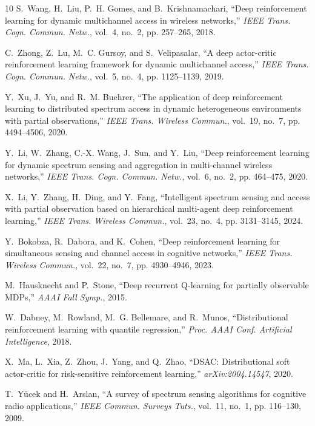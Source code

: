 \documentclass[journal]{IEEEtran}
\begin{document}
{\begin{thebibliography}{10}
S.~Wang, H.~Liu, P.~H. Gomes, and B.~Krishnamachari, ``Deep reinforcement
  learning for dynamic multichannel access in wireless networks,'' \emph{IEEE
  Trans. Cogn. Commun. Netw.}, vol.~4, no.~2, pp. 257--265, 2018.

C.~Zhong, Z.~Lu, M.~C. Gursoy, and S.~Velipasalar, ``A deep actor-critic
  reinforcement learning framework for dynamic multichannel access,''
  \emph{IEEE Trans. Cogn. Commun. Netw.}, vol.~5, no.~4, pp. 1125--1139, 2019.

Y.~Xu, J.~Yu, and R.~M. Buehrer, ``The application of deep reinforcement
  learning to distributed spectrum access in dynamic heterogeneous environments
  with partial observations,'' \emph{IEEE Trans. Wireless Commun.}, vol.~19,
  no.~7, pp. 4494--4506, 2020.

Y.~Li, W.~Zhang, C.-X. Wang, J.~Sun, and Y.~Liu, ``Deep reinforcement learning
  for dynamic spectrum sensing and aggregation in multi-channel wireless
  networks,'' \emph{IEEE Trans. Cogn. Commun. Netw.}, vol.~6, no.~2, pp.
  464--475, 2020.

X.~Li, Y.~Zhang, H.~Ding, and Y.~Fang, ``Intelligent spectrum sensing and
  access with partial observation based on hierarchical multi-agent deep
  reinforcement learning,'' \emph{IEEE Trans. Wireless Commun.}, vol.~23,
  no.~4, pp. 3131--3145, 2024.

Y.~Bokobza, R.~Dabora, and K.~Cohen, ``Deep reinforcement learning for
  simultaneous sensing and channel access in cognitive networks,'' \emph{IEEE
  Trans. Wireless Commun.}, vol.~22, no.~7, pp. 4930--4946, 2023.

M.~Hausknecht and P.~Stone, ``Deep recurrent {Q}-learning for partially
  observable {MDPs},'' \emph{AAAI Fall Symp.}, 2015.

W.~Dabney, M.~Rowland, M.~G. Bellemare, and R.~Munos, ``Distributional
  reinforcement learning with quantile regression,'' \emph{Proc. AAAI Conf.
  Artificial Intelligence}, 2018.

X.~Ma, L.~Xia, Z.~Zhou, J.~Yang, and Q.~Zhao, ``{DSAC}: Distributional soft
  actor-critic for risk-sensitive reinforcement learning,''
  \emph{arXiv:2004.14547}, 2020.

T.~Y\"ucek and H.~Arslan, ``A survey of spectrum sensing algorithms for
  cognitive radio applications,'' \emph{IEEE Commun. Surveys Tuts.}, vol.~11,
  no.~1, pp. 116--130, 2009.


\end{thebibliography}}
\end{document}
